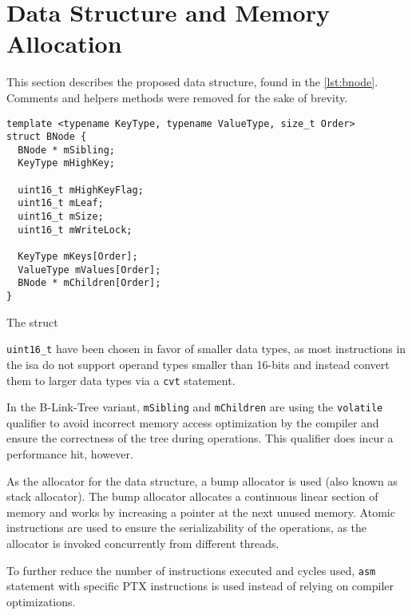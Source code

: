 \section{Data Structure and Memory Allocation}

This section describes the proposed data structure, found in the \cref{lst:bnode}. Comments and helpers methods were removed for the sake of brevity.

\begin{listing}[H]
  \begin{verbatim}
template <typename KeyType, typename ValueType, size_t Order>
struct BNode {
  BNode * mSibling;
  KeyType mHighKey;

  uint16_t mHighKeyFlag;
  uint16_t mLeaf;
  uint16_t mSize;
  uint16_t mWriteLock;

  KeyType mKeys[Order];
  ValueType mValues[Order];
  BNode * mChildren[Order]; 
}
    \end{verbatim}
  \caption{The  struct}\label{lst:bnode}
\end{listing}

\texttt{uint16_t} have been chosen in favor of smaller data types, as most instructions in the \acrshort{isa} do not support operand types smaller than 16-bits and instead convert them to larger data types via a \texttt{cvt} statement.

In the B-Link-Tree variant, \texttt{mSibling} and \texttt{mChildren} are using the \texttt{volatile} qualifier to avoid incorrect memory access optimization by the compiler and ensure the correctness of the tree during operations. This qualifier does incur a performance hit, however.

As the allocator for the data structure, a bump allocator is used (also known as stack allocator). The bump allocator allocates a continuous linear section of memory and works by increasing a pointer at the next unused memory. Atomic instructions are used to ensure the serializability of the operations, as the allocator is invoked concurrently from different threads.

To further reduce the number of instructions executed and cycles used, \texttt{asm} statement with specific PTX instructions is used instead of relying on compiler optimizations.